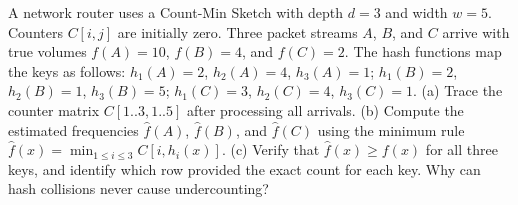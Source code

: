 \begin{exercise}
A network router uses a Count-Min Sketch with depth $d = 3$ and width $w = 5$. Counters $C[i, j]$ are initially zero.
Three packet streams $A$, $B$, and $C$ arrive with true volumes $f(A) = 10$, $f(B) = 4$, and $f(C) = 2$.
The hash functions map the keys as follows:
$h_1(A)=2$, $h_2(A)=4$, $h_3(A)=1$;
$h_1(B)=2$, $h_2(B)=1$, $h_3(B)=5$;
$h_1(C)=3$, $h_2(C)=4$, $h_3(C)=1$.
(a) Trace the counter matrix $C[1..3, 1..5]$ after processing all arrivals.
(b) Compute the estimated frequencies $\hat{f}(A)$, $\hat{f}(B)$, and $\hat{f}(C)$ using the minimum rule $\hat{f}(x) = \min_{1 \le i \le 3} C[i, h_i(x)]$.
(c) Verify that $\hat{f}(x) \ge f(x)$ for all three keys, and identify which row provided the exact count for each key. Why can hash collisions never cause undercounting?
\end{exercise}
